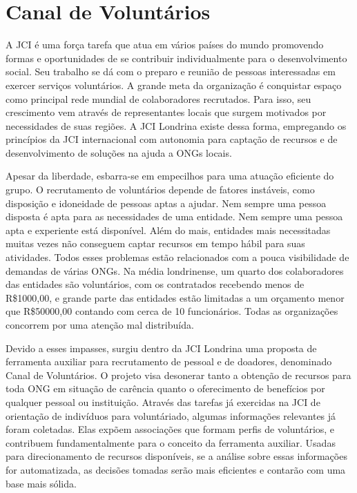 \section{Canal de Voluntários}

A JCI é uma força tarefa que atua em vários países do mundo promovendo formas e oportunidades de se contribuir individualmente para o desenvolvimento social. 
Seu trabalho se dá com o preparo e reunião de pessoas interessadas em exercer serviços voluntários. A grande meta da organização é conquistar espaço como principal 
rede mundial de colaboradores recrutados. Para isso, seu crescimento vem através de representantes locais que surgem motivados por necessidades de suas regiões. 
A JCI Londrina existe dessa forma, empregando os princípios da JCI internacional com autonomia para captação de recursos e de desenvolvimento de soluções na ajuda
a ONGs locais.

Apesar da liberdade, esbarra-se em empecilhos para uma atuação eficiente do grupo. O recrutamento de voluntários depende de fatores instáveis, como disposição e 
idoneidade de pessoas aptas a ajudar. Nem sempre uma pessoa disposta é apta para as necessidades de uma entidade. Nem sempre uma pessoa apta e experiente está
disponível. Além do mais, entidades mais necessitadas muitas vezes não conseguem captar recursos em tempo hábil para suas atividades. Todos esses problemas estão 
relacionados com a pouca visibilidade de demandas de várias ONGs. Na média londrinense, um quarto dos colaboradores das entidades são voluntários, com os contratados
recebendo menos de R\$1000,00, e grande parte das entidades estão limitadas a um orçamento menor que R\$50000,00 contando com cerca de 10 funcionários. Todas as
organizações concorrem por uma atenção mal distribuída.

Devido a esses impasses, surgiu dentro da JCI Londrina uma proposta de ferramenta auxiliar para recrutamento de pessoal e de doadores, denominado Canal de
Voluntários. O projeto visa desonerar tanto a obtenção de recursos para toda ONG em situação de carência quanto o oferecimento de benefícios por qualquer pessoal
ou instituição. Através das tarefas já exercidas na JCI de orientação de indivíduos para voluntáriado, algumas informações relevantes já foram coletadas. Elas
expõem associações que formam perfis de voluntários, e contribuem fundamentalmente para o conceito da ferramenta auxiliar. Usadas para direcionamento de recursos
disponíveis, se a análise sobre essas informações for automatizada, as decisões tomadas serão mais eficientes e contarão com uma base mais sólida.

